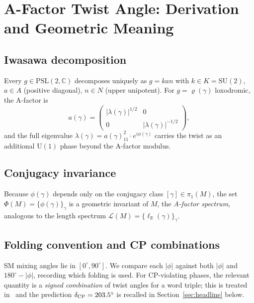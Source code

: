 \documentclass[preprint,12pt,number]{elsarticle}
\newcommand{\PSL}{\mathrm{PSL}(2,\mathbb{C})}
\newcommand{\pioneM}{\pi_1(M)}
\newcommand{\degr}{^{\circ}}
\begin{document}
\section{A-Factor Twist Angle: Derivation and Geometric Meaning}
\label{sec:derivation}

\subsection{Iwasawa decomposition}

Every $g\in\PSL$ decomposes uniquely as $g=kan$ with
$k\in K=\mathrm{SU}(2)$, $a\in A$ (positive diagonal), $n\in N$ (upper
unipotent).
For $g=\varrho(\gamma)$ loxodromic, the A-factor is
\begin{equation}
  a(\gamma) =
  \begin{pmatrix}|\lambda(\gamma)|^{1/2}&0\\0&|\lambda(\gamma)|^{-1/2}\end{pmatrix},
\end{equation}
and the full eigenvalue $\lambda(\gamma)=a(\gamma)_{\!11}^2\cdot e^{i\phi(\gamma)}$
carries the twist as an additional $\mathrm{U}(1)$ phase beyond the A-factor modulus.

\subsection{Conjugacy invariance}

Because $\phi(\gamma)$ depends only on the conjugacy class $[\gamma]\in\pioneM$,
the set $\Phi(M)=\{\phi(\gamma)\}_\gamma$ is a geometric invariant of $M$,
the \emph{A-factor spectrum}, analogous to the length spectrum
$\mathcal{L}(M)=\{\ell_{\mathbb{R}}(\gamma)\}_\gamma$.

\subsection{Folding convention and CP combinations}

SM mixing angles lie in $[0\degr,90\degr]$.
We compare each $|\phi|$ against both $|\phi|$ and $180\degr-|\phi|$,
recording which folding is used.
For CP-violating phases, the relevant quantity is a \emph{signed combination}
of twist angles for a word triple; this is treated in~\cite{GentryCP} and
the prediction $\delta_{\rm CP}=203.5\degr$ is recalled in
Section~\ref{sec:headline} below.

\end{document}

